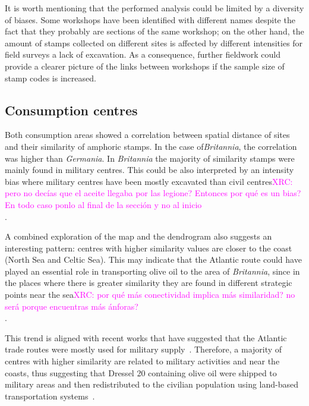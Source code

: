 \documentclass[review]{elsarticle}
\newcommand{\memo}[2]{\textcolor{#1}{#2}}
\newcommand{\xavi}[1]{\memo{magenta}{XRC: #1\\}}
\begin{document}
It is worth mentioning that the performed analysis could be limited by a diversity of biases. Some workshops have been identified with different names despite the fact that they probably are sections of the same workshop; on the other hand, the amount of stamps collected on different sites is affected by different intensities for field surveys a lack of excavation. As a consequence, further fieldwork could provide a clearer picture of the links between workshops if the sample size of stamp codes is increased.

\subsection{Consumption centres}

Both consumption areas showed a correlation between spatial distance of sites and their similarity of amphoric stamps. In the case of\textit{Britannia}, the correlation was higher than \textit{Germania}. In \textit{Britannia} the majority of similarity stamps were mainly found in military centres. This could be also interpreted by an intensity bias where military centres have been mostly excavated than civil centres\xavi{pero no decías que el aceite llegaba por las legione? Entonces por qué es un bias? En todo caso ponlo al final de la sección y no al inicio}. 

A combined exploration of the map and the dendrogram also suggests an interesting pattern: centres with higher similarity values are closer to the coast (North Sea and Celtic Sea). This may indicate that the Atlantic route could have played an essential role in transporting olive oil to the area of \textit{Britannia}, since in the places where there is greater similarity they are found in different strategic points near the sea\xavi{por qué más conectividad implica más similaridad? no será porque encuentras más ánforas?}.

This trend is aligned with recent works that have suggested that the Atlantic trade routes were mostly used for military supply~\citep{remesal_annona_1986,remesal_provincial_2008,carreras_atlantic_2012,morillo_hispania_2016,rubio-campillo_provincias_2018}. Therefore, a majority of centres with higher similarity are related to military activities and near the coasts, thus suggesting that Dressel 20 containing olive oil were shipped to military areas and then redistributed to the civilian population using land-based transportation systems~\citep{carreras_britannia_1998,ayllon_olive_2018}.
\end{document}
